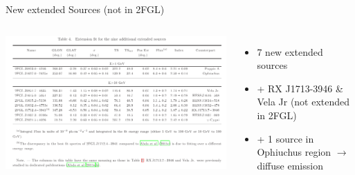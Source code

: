 \documentclass[12pt]{beamer}
\begin{document}
\begin{frame}{New extended Sources (not in 2FGL)}
  \begin{columns}
    \includegraphics[scale=0.30]{plots/new_extended.png}
    \begin{itemize}
      \item 7 new extended sources
      \item + RX J1713-3946 \& Vela Jr (not extended in 2FGL)
      \item + 1 source in Ophiuchus region $\rightarrow$ diffuse emission
    \end{itemize}
  \end{columns}
\end{frame}
\end{document}
